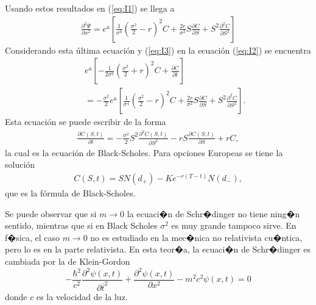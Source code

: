 \documentclass[portrait, a0b,final]{a0poster}%
\numberwithin{equation}{section}
\newenvironment{poster}{
  \begin{center}
  \begin{minipage}[c]{0.98\textwidth}
}{
  \end{minipage}
  \end{center}
}
\newenvironment{pcolumn}[1]{
  \begin{minipage}{#1\textwidth}
  \begin{center}
}{
  \end{center}
  \end{minipage}
}
\newcommand{\pbox}[4]{
\psshadowbox[#3]{
\begin{minipage}[t][#2][t]{#1}
#4
\end{minipage}
}}
\begin{document}
\begin{poster}
\begin{center}
\begin{pcolumn}{0.32}
{Usando estos resultados en (\ref{eq:I1}) se llega a 
%
\begin{eqnarray}
\frac{\partial^2 \Psi}{\partial x^2}=e^\vartriangle \left[\frac{1}{\sigma^4}\left(\frac{\sigma^2}{2}-r\right)^2  C +\frac{2r}{\sigma^2}S\frac{\partial C}{\partial S}+ S^2 \frac{\partial^2 C}{\partial S^2}\right]
\end{eqnarray}
%
Considerando esta \'ultima ecuaci\'on y (\ref{eq:I3}) en la ecuaci\'on (\ref{eq:I2}) se encuentra 
%
\begin{eqnarray}
& &e^\vartriangle \left[-\frac{1}{2\sigma^2}(\frac{\sigma^2}{2}+r)^2C+\frac{\partial C}{\partial t}\right]\nonumber\\
& &=-\frac{\sigma^2}{2}e^\vartriangle \left[\frac{1}{\sigma^4}\left(\frac{\sigma^2}{2}-r\right)^2  C +\frac{2r}{\sigma^2}S\frac{\partial C}{\partial S}+ S^2 \frac{\partial^2 C}{\partial S^2}\right].
\end{eqnarray}
%
Esta ecuaci\'on se puede escribir de la forma
%
\begin{eqnarray}
\frac{\partial C(S,t)}{\partial t}=-\frac{\sigma^2}{2}S^2\frac{\partial^2 C(S,t)}{\partial S^2}-rS\frac{\partial C(S,t)}{\partial S}+rC,
\end{eqnarray}
%
la cual es la ecuaci\'on de Black-Scholes. Para opciones Europeas se tiene la soluci\'on 
%
\begin{eqnarray}
C(S,t)=  SN(d_{+})-Ke^{-r(T-t)} N(d_{-}) ,
\end{eqnarray}
%  
que es la f\'ormula de Black-Scholes.
\vspace{1cm}
    \begin{center}
        \pbox{0.8\textwidth}{}%
        {linewidth=2mm,framearc=0.1,linecolor=lightblue,fillstyle=gradient,gradangle=0,%
        gradbegin=white,gradend=whiteblue,gradmidpoint=1.0,framesep=1em}{%
        \begin{center}
            Caso Relativista
        \end{center}}
    \end{center}
    \vspace{1.25cm}
\setcounter{section}{4}%
\setcounter{equation}{0}%


Se puede observar que  si $m\rightarrow 0$ la ecuaci�n de Schr�dinger no tiene ning�n sentido, mientras que si en Black Scholes $\sigma^2$ es muy grande  tampoco sirve. En f�sica, el caso $m\rightarrow 0$ no es estudiado en la mec�nica no relativista cu�ntica, pero lo es en la parte relativista. En esta teor�a, la ecuaci�n de Schr�dinger es cambiada por la de Klein-Gordon
$$ -\frac{\hbar ^2}{c^2}\frac{\partial^{2} \psi (x,t)}{\partial  \bar{t}^2}+\frac{\partial^2 \psi (x,t)}{\partial x^2} - m^2c^2\psi (x,t) =0$$
donde $c$ es la velocidad de la luz.\\

}
\end{pcolumn}
\end{center}
\end{poster}
\end{document}

